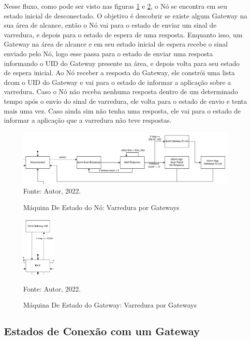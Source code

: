 Nesse fluxo, como pode ser visto nas figuras \ref{fig:fsm-node-scan} e \ref{fig:fsm-gw-scan},
o Nó se encontra em seu estado inicial de desconectado.
O objetivo é descobrir se existe algum Gateway na sua área de alcance,
então o Nó vai para o estado de enviar um sinal de varredura, e depois
para o estado de espera de uma resposta. Enquanto isso, um Gateway na
área de alcance e em seu estado inicial de espera recebe o sinal enviado
pelo Nó, logo esse passa para o estado de enviar uma resposta informando
o UID do Gateway presente na área, e depois volta para seu estado de espera
inicial. Ao Nó receber a resposta do Gateway, ele constrói uma lista
dcom o UID do Gateway e vai para o estado de informar a aplicação sobre
a varredura. Caso o Nó não receba nenhuma resposta dentro de um determinado
tempo após o envio do sinal de varredura, ele volta para o estado de envio
e tenta mais uma vez. Caso ainda sim não tenha uma resposta, ele vai para
o estado de informar a aplicação que a varredura não teve respostas.

\begin{figure}[htp]
    \centering
	\caption{Máquina De Estado do Nó: Varredura por Gateways}
    \includegraphics[width=\textwidth]{img/node-scan.drawio.png}
    Fonte: Autor, 2022.
    \label{fig:fsm-node-scan}
\end{figure}

\begin{figure}[htp]
    \centering
	\caption{Máquina De Estado do Gateway: Varredura por Gateways}
    \includegraphics[width=0.15\textwidth]{img/gw-scan.drawio.png}
    
    Fonte: Autor, 2022.
    \label{fig:fsm-gw-scan}
\end{figure}

\subsection{Estados de Conexão com um Gateway}

